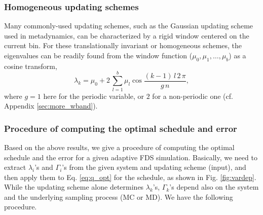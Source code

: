 \documentclass[reprint, superscriptaddress, floatfix]{revtex4-1}
\begin{document}
\subsubsection{\label{sec:band-matrix}
Homogeneous updating schemes}



Many commonly-used updating schemes,
such as the Gaussian updating scheme
used in metadynamics,
can be characterized by a rigid window
centered on the current bin.
%
For these translationally invariant or homogeneous
schemes, the eigenvalues can be readily found
from the window function ($\mu_0, \mu_1, \dots, \mu_b$)
as a cosine transform,
%
\begin{equation}
  \lambda_k
  =
  \mu_0
  +
  2 \,
  \sum_{ l = 1 }^b
  \mu_l
  \cos
  \frac{ (k - 1) \, l \, 2 \, \pi }
       {            g \, n        }
  ,
  \label{eq:wband_eigenvalue}
\end{equation}
%
where $g = 1$ here for the periodic variable,
or $2$ for a non-periodic one
(cf. Appendix \ref{sec:more_wband}).



\subsubsection{\label{sec:procedure}
Procedure of computing the optimal schedule and error
}


Based on the above results,
we give a procedure of computing
the optimal schedule and the error
for a given adaptive FDS simulation.
%
Basically, we need to extract
$\lambda_i$'s and $\Gamma_i$'s
from the given system and updating scheme (input),
and then apply them to Eq. \eqref{eq:q_opt}
for the schedule,
as shown in Fig. \ref{fig:vardep}.
%
%
While the updating scheme alone
determines $\lambda_k$'s,
$\Gamma_k$'s depend also on the system
and the underlying sampling process (MC or MD).
%
We have the following procedure.
\end{document}
